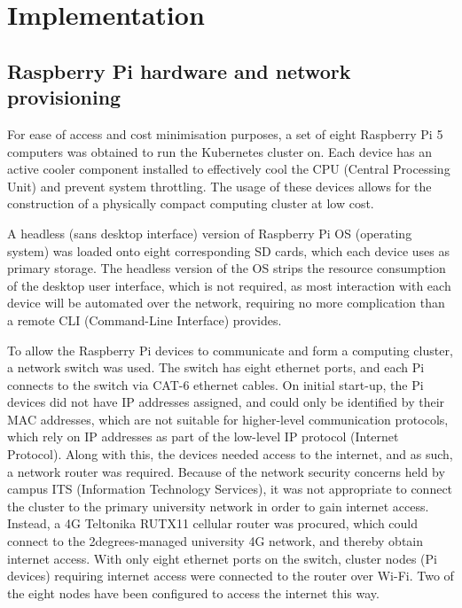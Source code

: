 \chapter{Implementation}

\section{Raspberry Pi hardware and network provisioning}

For ease of access and cost minimisation purposes, a set of eight Raspberry Pi 5 computers was obtained to run the Kubernetes cluster on. Each device has an active cooler component installed to effectively cool the CPU (Central Processing Unit) and prevent system throttling. The usage of these devices allows for the construction of a physically compact computing cluster at low cost.

A headless (sans desktop interface) version of Raspberry Pi OS (operating system) was loaded onto eight corresponding SD cards, which each device uses as primary storage. The headless version of the OS strips the resource consumption of the desktop user interface, which is not required, as most interaction with each device will be automated over the network, requiring no more complication than a remote CLI (Command-Line Interface) provides.

To allow the Raspberry Pi devices to communicate and form a computing cluster, a network switch was used. The switch has eight ethernet ports, and each Pi connects to the switch via CAT-6 ethernet cables. On initial start-up, the Pi devices did not have IP addresses assigned, and could only be identified by their MAC addresses, which are not suitable for higher-level communication protocols, which rely on IP addresses as part of the low-level IP protocol (Internet Protocol). Along with this, the devices needed access to the internet, and as such, a network router was required. Because of the network security concerns held by campus ITS (Information Technology Services), it was not appropriate to connect the cluster to the primary university network in order to gain internet access. Instead, a 4G Teltonika RUTX11 cellular router was procured, which could connect to the 2degrees-managed university 4G network, and thereby obtain internet access. With only eight ethernet ports on the switch, cluster nodes (Pi devices) requiring internet access were connected to the router over Wi-Fi. Two of the eight nodes have been configured to access the internet this way.

